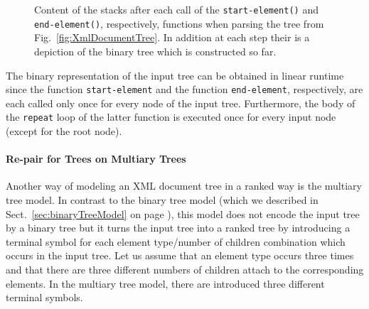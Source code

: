 \documentclass[12pt]{llncs}
\begin{document}
\begin{figure}[p]
{\begin{multicols}{2}
\begin{enumerate}[(1)]
\begin{raggedleft}
{\begin{raggedleft}
					\end{raggedleft}
				}
			\end{raggedleft}
	\end{enumerate}
	\end{multicols}
	}
	\caption{Content of the stacks after each call of the \texttt{start-element()} and \texttt{end-element()}, respectively, functions when parsing the tree from Fig.~\ref{fig:XmlDocumentTree}. In addition at each step their is a depiction of the binary tree which is constructed so far.}\label{fig:constructionOfBinaryTree}
\end{figure}
The binary representation of the input tree can be obtained in linear runtime since the function \verb|start-element| and the function \verb|end-element|, respectively, are each called only once for every node of the input tree. Furthermore, the body of the \verb|repeat| loop of the latter function is executed once for every input node (except for the root node).

\paragraph{Re-pair for Trees on Multiary Trees}\label{par:RemarksMultiaryModel}

Another way of modeling an XML document tree in a ranked way is the multiary tree model. In contrast to the binary tree model (which we described in Sect.~\ref{sec:binaryTreeModel} on page \pageref{sec:binaryTreeModel}), this model does not encode the input tree by a binary tree but it turns the input tree into a ranked tree by introducing a terminal symbol for each element type/number of children combination which occurs in the input tree. Let us assume that an element type occurs three times and that there are three different numbers of children attach to the corresponding elements. In the multiary tree model, there are introduced three different terminal symbols.
\end{document}
